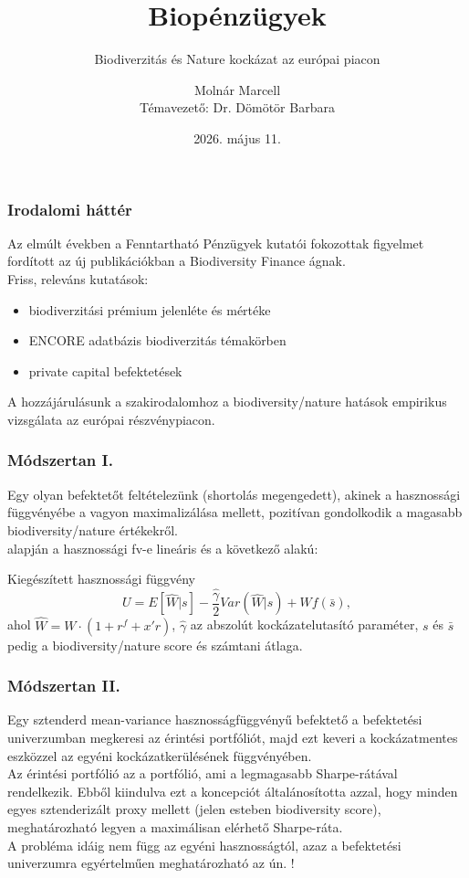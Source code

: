 \documentclass[aspectratio=169,notheorems]{corvinusmetropolis}
\title{Biopénzügyek}
\subtitle{Biodiverzitás és Nature kockázat az európai piacon}
\author{Molnár Marcell\\Témavezető: Dr. Dömötör Barbara}
\institute[Corvinus University]
  {
  Pénzügy és számvitel alapszak\\
  Pénzügy specializáció\\
  Email: \putemail
  }
\date{2026. május 11.}
\begin{document}
\simpleopen{}

\begin{frame}
  \frametitle{Irodalomi háttér}
  Az elmúlt években a Fenntartható Pénzügyek kutatói fokozottak figyelmet fordított az új publikációkban a Biodiversity Finance ágnak.\\ 
  Friss, releváns kutatások:
  \begin{itemize}
    \item \alert{biodiverzitási prémium} jelenléte és mértéke \parencite{coqueret_biodiversity_2024, naffa_biodiversity_2024}
    \item \alert{ENCORE adatbázis} biodiverzitás témakörben \parencite{clement_mapping_2025}
    \item \alert{private capital befektetések} \parencite{flammer_biodiversity_2025}\\
  \end{itemize}
  A hozzájárulásunk a szakirodalomhoz a biodiversity/nature hatások empirikus vizsgálata az európai részvénypiacon.
\end{frame}

\begin{frame}
  \frametitle{Módszertan I.}
  Egy olyan befektetőt feltételezünk (shortolás megengedett), akinek a hasznossági függvényébe a vagyon maximalizálása mellett, \alert{pozitívan gondolkodik a magasabb biodiversity/nature értékekről}.\\
  \pause
  \textcite{pedersen_responsible_2021} alapján a \alert{hasznossági fv-e lineáris és a következő alakú}:
  \begin{block}{Kiegészített hasznossági függvény}
  \begin{equation}
    U = E[\widehat{W}|s] - \frac{\hat{\gamma}}{2}Var(\widehat{W}|s) + Wf(\bar{s}),
  \end{equation}
  ahol $\widehat{W}=W\cdot(1+r^f+x'r)$, $\hat{\gamma}$ az abszolút kockázatelutasító paraméter, $s$ és $\bar{s}$ pedig a biodiversity/nature score és számtani átlaga.
  \end{block}
\end{frame}

\begin{frame}
  \frametitle{Módszertan II.}
  Egy sztenderd mean-variance hasznosságfüggvényű befektető a befektetési univerzumban megkeresi az \alert{érintési portfóliót}, majd ezt keveri a \alert{kockázatmentes eszközzel} az egyéni kockázatkerülésének függvényében.\\
  \pause
  \medskip
  Az érintési portfólió az a portfólió, ami a legmagasabb Sharpe-rátával rendelkezik. Ebből kiindulva \alert{ezt a koncepciót \textcite{pedersen_responsible_2021} általánosította} azzal, hogy \alert{minden egyes sztenderizált proxy mellett} (jelen esteben biodiversity score), \alert{meghatározható legyen a maximálisan elérhető Sharpe-ráta}.\\
  \pause
  \bigskip
  A probléma idáig nem függ az egyéni hasznosságtól, azaz a befektetési univerzumra egyértelműen meghatározható az ún. !
\end{frame}
\end{document}
